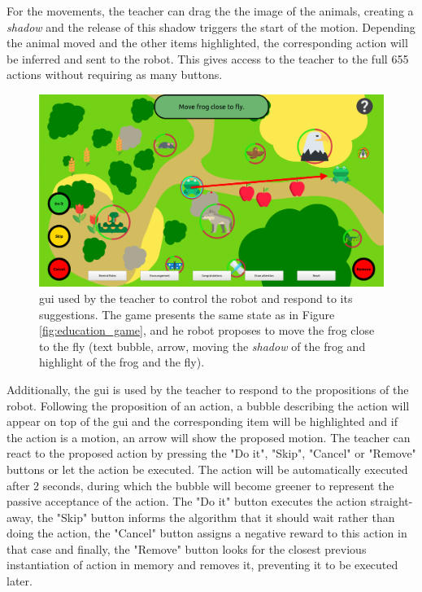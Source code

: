 For the movements, the teacher can drag the the image of the animals, creating a \textit{shadow} and the release of this shadow triggers the start of the motion. Depending the animal moved and the other items highlighted, the corresponding action will be inferred and sent to the robot. This gives access to the teacher to the full 655 actions without requiring as many buttons.

\begin{figure}[ht]
	\centering
	\includegraphics[width=1\textwidth]{gui.png}
	\captionsetup{width=.9\linewidth}
	\caption{\gls{gui} used by the teacher to control the robot and respond to its suggestions. The game presents the same state as in Figure \ref{fig:education_game}, and he robot proposes to move the frog close to the fly (text bubble, arrow, moving the \textit{shadow} of the frog and highlight of the frog and the fly).}
	\label{fig:education_gui}
\end{figure}

Additionally, the \gls{gui} is used by the teacher to respond to the propositions of the robot. Following the proposition of an action, a bubble describing the action will appear on top of the \gls{gui} and the corresponding item will be highlighted and if the action is a motion, an arrow will show the proposed motion. The teacher can react to the proposed action by pressing the "Do it", "Skip", "Cancel" or "Remove" buttons or let the action be executed. The action will be automatically executed after 2 seconds, during which the bubble will become greener to represent the passive acceptance of the action. The "Do it" button executes the action straight-away, the "Skip" button informs the algorithm that it should wait rather than doing the action, the "Cancel" button assigns a negative reward to this action in that case and finally, the "Remove" button looks for the closest previous instantiation of action in memory and removes it, preventing it to be executed later.

